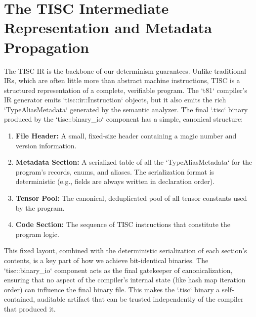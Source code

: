 \documentclass[sigconf, 10pt]{acmart}
\begin{document}
\section{The TISC Intermediate Representation and Metadata Propagation}
The TISC IR is the backbone of our determinism guarantees. Unlike traditional IRs, which are often little more than abstract machine instructions, TISC is a structured representation of a complete, verifiable program. The `t81` compiler's IR generator emits `tisc::ir::Instruction` objects, but it also emits the rich `TypeAliasMetadata` generated by the semantic analyzer.
The final `.tisc` binary produced by the `tisc::binary_io` component has a simple, canonical structure:
\begin{enumerate}
\item \textbf{File Header:} A small, fixed-size header containing a magic number and version information.
\item \textbf{Metadata Section:} A serialized table of all the `TypeAliasMetadata` for the program's records, enums, and aliases. The serialization format is deterministic (e.g., fields are always written in declaration order).
\item \textbf{Tensor Pool:} The canonical, deduplicated pool of all tensor constants used by the program.
\item \textbf{Code Section:} The sequence of TISC instructions that constitute the program logic.
\end{enumerate}
This fixed layout, combined with the deterministic serialization of each section's contents, is a key part of how we achieve bit-identical binaries. The `tisc::binary_io` component acts as the final gatekeeper of canonicalization, ensuring that no aspect of the compiler's internal state (like hash map iteration order) can influence the final binary file. This makes the `.tisc` binary a self-contained, auditable artifact that can be trusted independently of the compiler that produced it.
\end{document}
